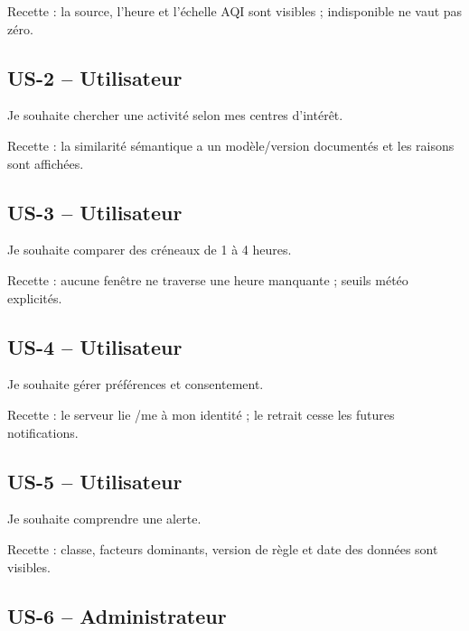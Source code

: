 \documentclass[10pt,a4paper]{article}
\begin{document}
Recette : la source, l'heure et l'échelle AQI sont visibles ; indisponible ne vaut pas zéro.\par

\subsection*{US-2  --  Utilisateur}

Je souhaite chercher une activité selon mes centres d'intérêt.\par

Recette : la similarité sémantique a un modèle/version documentés et les raisons sont affichées.\par

\subsection*{US-3  --  Utilisateur}

Je souhaite comparer des créneaux de 1 à 4 heures.\par

Recette : aucune fenêtre ne traverse une heure manquante ; seuils météo explicités.\par

\subsection*{US-4  --  Utilisateur}

Je souhaite gérer préférences et consentement.\par

Recette : le serveur lie /me à mon identité ; le retrait cesse les futures notifications.\par

\subsection*{US-5  --  Utilisateur}

Je souhaite comprendre une alerte.\par

Recette : classe, facteurs dominants, version de règle et date des données sont visibles.\par

\subsection*{US-6  --  Administrateur}
\end{document}
